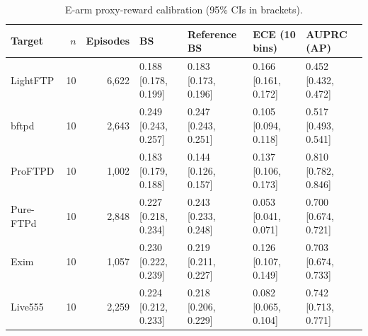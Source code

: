 \begin{table}[t]
\centering\footnotesize
\caption{E-arm proxy-reward calibration (95\% CIs in brackets).}
\label{tab:logged_calibration}
\begin{tabularx}{\textwidth}{l r r *{4}{>{\centering\arraybackslash}X}}
\toprule
Target & $n$ & Episodes & BS & Reference BS & ECE (10 bins) & AUPRC (AP) \\
\midrule
LightFTP & 10 & 6,622 & \shortstack{0.188\\{[0.178, 0.199]}} & \shortstack{0.183\\{[0.173, 0.196]}} & \shortstack{0.166\\{[0.161, 0.172]}} & \shortstack{0.452\\{[0.432, 0.472]}} \\
bftpd & 10 & 2,643 & \shortstack{0.249\\{[0.243, 0.257]}} & \shortstack{0.247\\{[0.243, 0.251]}} & \shortstack{0.105\\{[0.094, 0.118]}} & \shortstack{0.517\\{[0.493, 0.541]}} \\
ProFTPD & 10 & 1,002 & \shortstack{0.183\\{[0.179, 0.188]}} & \shortstack{0.144\\{[0.126, 0.157]}} & \shortstack{0.137\\{[0.106, 0.173]}} & \shortstack{0.810\\{[0.782, 0.846]}} \\
Pure-FTPd & 10 & 2,848 & \shortstack{0.227\\{[0.218, 0.234]}} & \shortstack{0.243\\{[0.233, 0.248]}} & \shortstack{0.053\\{[0.041, 0.071]}} & \shortstack{0.700\\{[0.674, 0.721]}} \\
Exim & 10 & 1,057 & \shortstack{0.230\\{[0.222, 0.239]}} & \shortstack{0.219\\{[0.211, 0.227]}} & \shortstack{0.126\\{[0.107, 0.149]}} & \shortstack{0.703\\{[0.674, 0.733]}} \\
Live555 & 10 & 2,259 & \shortstack{0.224\\{[0.212, 0.233]}} & \shortstack{0.218\\{[0.206, 0.229]}} & \shortstack{0.082\\{[0.065, 0.104]}} & \shortstack{0.742\\{[0.713, 0.771]}} \\

\end{tabularx}
\end{table}

